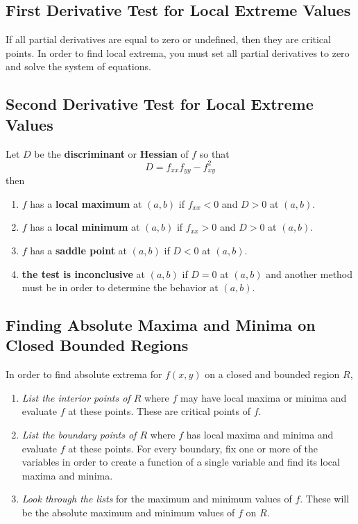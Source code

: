 \documentclass[12pt]{article}
\theoremstyle{break}
\numberwithin{theorem}{subsection}
\numberwithin{lemma}{subsection}
\numberwithin{corollary}{subsection}
\numberwithin{equation}{subsection}
\begin{document}
\subsection{First Derivative Test for Local Extreme Values}
If all partial derivatives are equal to zero or undefined, then they are critical points.
In order to find local extrema, you must set all partial derivatives to zero and solve the system
of equations.

\subsection{Second Derivative Test for Local Extreme Values}
Let $D$ be the \textbf{discriminant} or \textbf{Hessian} of $f$ so that
\begin{equation*}
D = f_{xx}f_{yy} - f_{xy}^2
\end{equation*}
then 
\begin{enumerate}
\item $f$ has a \textbf{local maximum} at $(a,b)$ if $f_{xx} < 0$ and $D > 0$ at $(a,b)$.
\item $f$ has a \textbf{local minimum} at $(a,b)$ if $f_{xx} > 0$ and $D > 0$ at $(a,b)$.
\item $f$ has a \textbf{saddle point} at $(a,b)$ if $D < 0$ at $(a,b)$.
\item \textbf{the test is inconclusive} at $(a,b)$ if $D = 0$ at $(a,b)$ and another method must be
	in order to determine the behavior at $(a,b)$.
\end{enumerate}

\subsection{Finding Absolute Maxima and Minima on Closed Bounded Regions}
In order to find absolute extrema for $f(x,y)$ on a closed and bounded region $R$, 
\begin{enumerate}
\item \textit{List the interior points of $R$} where $f$ may have local maxima or minima and 
	evaluate $f$ at these points. These are critical points of $f$.
\item \textit{List the boundary points of $R$} where $f$ has local maxima and minima and evaluate 
	$f$ at these points. For every boundary, fix one or more of the variables in order to create a
	function of a single variable and find its local maxima and minima. 
\item \textit{Look through the lists} for the maximum and minimum values of $f$. These will be the
	absolute maximum and minimum values of $f$ on $R$.
\end{enumerate}
\end{document}
